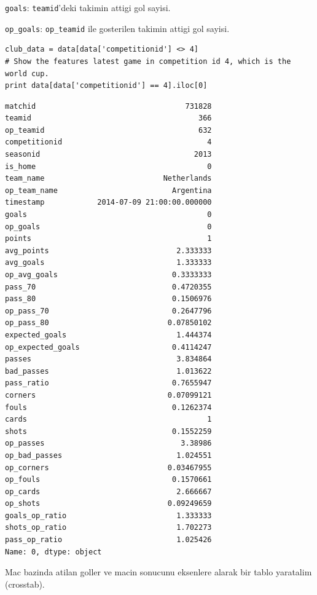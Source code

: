 \documentclass[12pt,fleqn]{article}\usepackage{../common}
\begin{document}
\verb!goals!: \verb!teamid!'deki takimin attigi gol sayisi.

\verb!op_goals!: \verb!op_teamid! ile gosterilen takimin attigi gol sayisi.

\begin{verbatim}
club_data = data[data['competitionid'] <> 4]
# Show the features latest game in competition id 4, which is the world cup.
print data[data['competitionid'] == 4].iloc[0]
\end{verbatim}

\begin{verbatim}
matchid                                  731828
teamid                                      366
op_teamid                                   632
competitionid                                 4
seasonid                                   2013
is_home                                       0
team_name                           Netherlands
op_team_name                          Argentina
timestamp            2014-07-09 21:00:00.000000
goals                                         0
op_goals                                      0
points                                        1
avg_points                             2.333333
avg_goals                              1.333333
op_avg_goals                          0.3333333
pass_70                               0.4720355
pass_80                               0.1506976
op_pass_70                            0.2647796
op_pass_80                           0.07850102
expected_goals                         1.444374
op_expected_goals                     0.4114247
passes                                 3.834864
bad_passes                             1.013622
pass_ratio                            0.7655947
corners                              0.07099121
fouls                                 0.1262374
cards                                         1
shots                                 0.1552259
op_passes                               3.38986
op_bad_passes                          1.024551
op_corners                           0.03467955
op_fouls                              0.1570661
op_cards                               2.666667
op_shots                             0.09249659
goals_op_ratio                         1.333333
shots_op_ratio                         1.702273
pass_op_ratio                          1.025426
Name: 0, dtype: object
\end{verbatim}

Mac bazinda atilan goller ve macin sonucunu eksenlere alarak bir tablo
yaratalim (crosstab).
\end{document}
